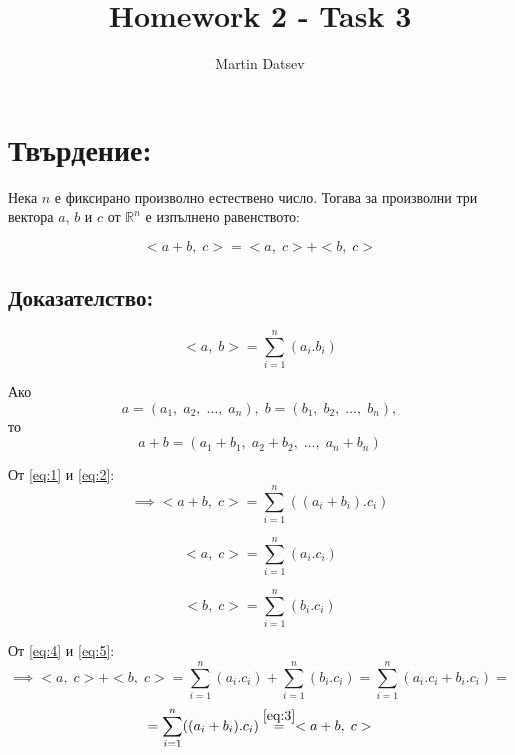 \documentclass{article}
\author{Martin Datsev}
\title{Homework 2 - Task 3}
\begin{document}
\maketitle
\section*{Твърдение:}
Нека $n$ е фиксирано произволно естествено число.
Тогава за произволни три вектора $a$, $b$ и $c$ от $\mathbb{R}^n$ е изпълнено равенството:

\[<a + b, \; c> = <a, \; c> + <b, \; c>\]
\subsection*{Доказателство:}


\[<a, \; b> = \displaystyle\sum_{i = 1}^n (a_i.b_i) \tag{1} \label{eq:1}\]

Ако
\[a = (a_1, \; a_2, \; \dots, \; a_n), \; b = (b_1, \; b_2, \; \dots, \; b_n),\]
то
\[a + b = (a_1 + b_1, \; a_2 + b_2, \; \dots, \; a_n + b_n) \tag{2} \label{eq:2}\]

От \eqref{eq:1} и \eqref{eq:2}:
\[\implies<a + b, \; c>=\displaystyle\sum_{i = 1}^n ((a_i + b_i).c_i) \tag{3} \label{eq:3}\]

\[<a, \; c> = \displaystyle\sum_{i = 1}^n (a_i.c_i) \tag{4} \label{eq:4}\]

\[<b, \; c> = \displaystyle\sum_{i = 1}^n (b_i.c_i) \tag{5} \label{eq:5}\]

От \eqref{eq:4} и \eqref{eq:5}:
\[\implies<a, \; c> + <b, \; c> = \displaystyle\sum_{i = 1}^n (a_i.c_i) + \displaystyle\sum_{i = 1}^n (b_i.c_i) = \displaystyle\sum_{i = 1}^n (a_i.c_i + b_i.c_i) =\]
\[= \displaystyle\sum_{i = 1}^n ((a_i + b_i).c_i) \overset{\eqref{eq:3}}{=} <a + b, \; c>\]
\end{document}
